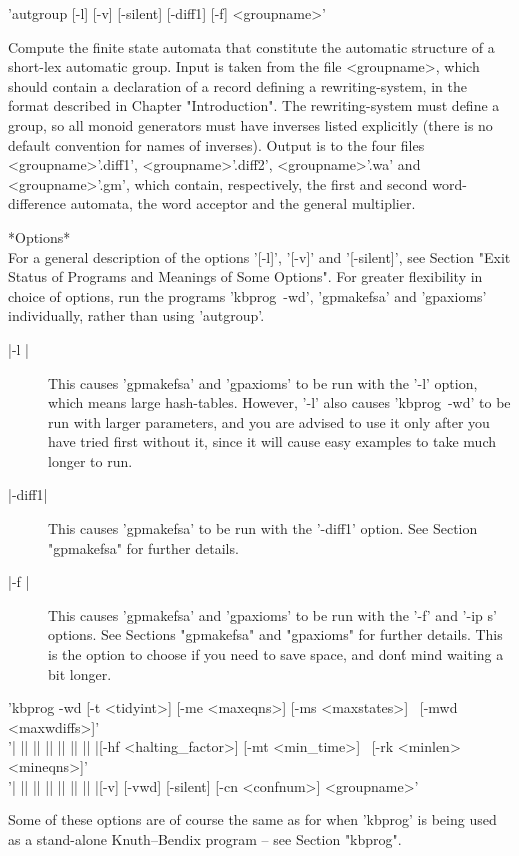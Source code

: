 'autgroup  [-l] [-v] [-silent] [-diff1] [-f] <groupname>'

Compute the finite state automata that constitute the automatic structure
of a short-lex automatic group. Input is taken from the file <groupname>,
which should contain a declaration of a record defining a rewriting-system, in
the format described in Chapter "Introduction". The rewriting-system must
define a group, so all monoid generators must have inverses listed explicitly
(there is no default convention for names of inverses). Output is to the
four files <groupname>'.diff1', <groupname>'.diff2', <groupname>'.wa' and
<groupname>'.gm', which contain, respectively, the first and second
word-difference automata, the word acceptor and the general multiplier.

*Options*\\
For a general description of the options '[-l]', '[-v]' and '[-silent]',
see Section
"Exit Status of Programs and Meanings of Some Options".
For greater flexibility in choice of options, run the programs 'kbprog\ -wd',
'gpmakefsa' and 'gpaxioms' individually, rather than using 'autgroup'. 

\begin{description}
\item[|-l |]
This causes 'gpmakefsa' and 'gpaxioms' to be run with the '-l' option, which
means large hash-tables. However, '-l' also causes 'kbprog\ -wd' to be run
with larger parameters, and you are advised to use it only after you
have tried first without it, since it will cause easy examples to take
much longer to run.
\item[|-diff1|]
This causes 'gpmakefsa' to be run with the '-diff1' option. See Section
"gpmakefsa" for further details.
\item[|-f |] This causes 'gpmakefsa' and 'gpaxioms' to be run with the
'-f' and '-ip s' options. See Sections "gpmakefsa" and "gpaxioms" for
further details. This is the option to choose if you need to save space,
and don\'t mind waiting a bit longer.
\end{description}
'kbprog -wd [-t <tidyint>] [-me <maxeqns>] [-ms <maxstates>] \
[-mwd <maxwdiffs>]'\\
'| || || || || || || |[-hf <halting\_factor>] [-mt <min\_time>] \
[-rk <minlen> <mineqns>]'\\
'| || || || || || || |[-v] [-vwd] [-silent] [-cn <confnum>] <groupname>'

Some of these options are of course the same as for when 'kbprog' is being
used as a stand-alone Knuth--Bendix program -- see Section "kbprog".


